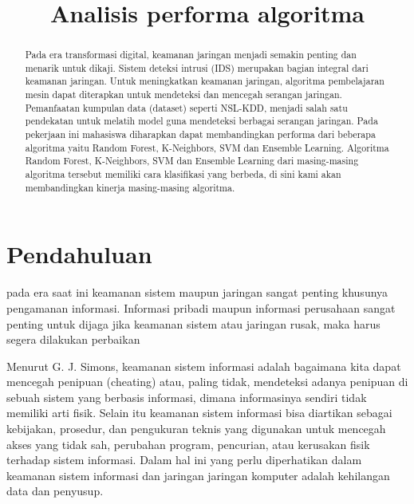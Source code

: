 \documentclass[conference]{IEEEtran}
\begin{document}
\title{Analisis performa algoritma}

\author{
}

\maketitle
\begin{abstract}
Pada era transformasi digital, keamanan jaringan menjadi semakin penting dan menarik untuk dikaji. Sistem deteksi intrusi (IDS) merupakan bagian integral dari keamanan jaringan. Untuk meningkatkan keamanan jaringan, algoritma pembelajaran mesin dapat diterapkan untuk mendeteksi dan mencegah serangan jaringan. Pemanfaatan kumpulan data (dataset) seperti NSL-KDD, menjadi salah satu pendekatan untuk melatih model guna mendeteksi berbagai serangan jaringan. Pada pekerjaan ini mahasiswa diharapkan dapat membandingkan performa dari beberapa algoritma yaitu Random Forest, K-Neighbors, SVM dan Ensemble Learning. Algoritma Random Forest, K-Neighbors, SVM dan Ensemble Learning dari masing-masing algoritma tersebut memiliki cara klasifikasi yang berbeda, di sini kami akan membandingkan kinerja masing-masing algoritma.
\end{abstract}

\section{Pendahuluan}
pada era saat ini keamanan sistem maupun jaringan sangat penting khusunya pengamanan informasi. Informasi pribadi maupun informasi perusahaan sangat penting untuk dijaga jika keamanan sistem atau jaringan rusak, maka harus segera dilakukan perbaikan

Menurut G. J. Simons, keamanan sistem informasi adalah bagaimana kita dapat mencegah penipuan (cheating) atau, paling tidak, mendeteksi adanya penipuan di sebuah sistem yang berbasis informasi, dimana informasinya sendiri tidak memiliki arti fisik. Selain itu keamanan sistem informasi bisa diartikan sebagai kebijakan, prosedur, dan pengukuran teknis yang digunakan untuk mencegah akses yang tidak sah, perubahan program, pencurian, atau kerusakan fisik terhadap sistem informasi. Dalam hal ini yang perlu diperhatikan dalam keamanan sistem informasi dan jaringan jaringan komputer adalah kehilangan data dan penyusup.
\end{document}
